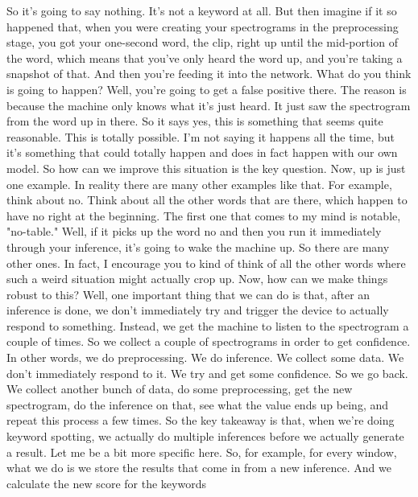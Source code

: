     So it's going to say nothing.
    It's not a keyword at all.
    But then imagine if it so happened that, when
    you were creating your spectrograms in the preprocessing stage,
    you got your one-second word, the clip, right up
    until the mid-portion of the word, which means
    that you've only heard the word up, and you're taking a snapshot of that.
    And then you're feeding it into the network.
    What do you think is going to happen?
    Well, you're going to get a false positive there.
    The reason is because the machine only knows what it's just heard.
    It just saw the spectrogram from the word up in there.
    So it says yes, this is something that seems quite reasonable.
    This is totally possible.
    I'm not saying it happens all the time, but it's
    something that could totally happen and does in fact happen with our own model.
    So how can we improve this situation is the key question.
    Now, up is just one example.
    In reality there are many other examples like that.
    For example, think about no.
    Think about all the other words that are there, which happen
    to have no right at the beginning.
    The first one that comes to my mind is notable, "no-table."
    Well, if it picks up the word no and then you
    run it immediately through your inference,
    it's going to wake the machine up.
    So there are many other ones.
    In fact, I encourage you to kind of think of all the other words
    where such a weird situation might actually crop up.
    Now, how can we make things robust to this?
    Well, one important thing that we can do is that, after an inference is done,
    we don't immediately try and trigger the device
    to actually respond to something.
    Instead, we get the machine to listen to the spectrogram a couple of times.
    So we collect a couple of spectrograms in order to get confidence.
    In other words, we do preprocessing.
    We do inference.
    We collect some data.
    We don't immediately respond to it.
    We try and get some confidence.
    So we go back.
    We collect another bunch of data, do some preprocessing,
    get the new spectrogram, do the inference on that,
    see what the value ends up being, and repeat this process a few times.
    So the key takeaway is that, when we're doing keyword spotting,
    we actually do multiple inferences before we actually generate a result.
    Let me be a bit more specific here.
    So, for example, for every window, what we do
    is we store the results that come in from a new inference.
    And we calculate the new score for the keywords
